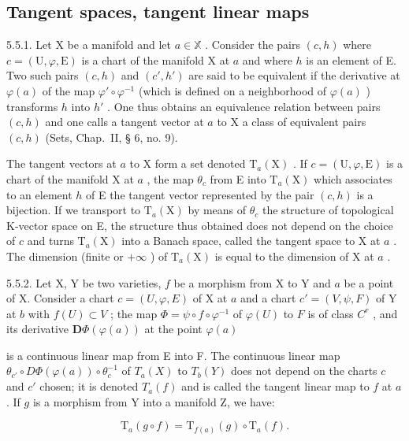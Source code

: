 \subsection{Tangent spaces, tangent linear maps}

5.5.1. Let X be a manifold and let \(a\in\mathbb{X}\) . Consider the pairs \((c,h)\) where \(c=(\mathrm{U},\varphi,\mathrm{E})\) is a chart of the manifold X at \(a\) and where \(h\) is an element of E. Two such pairs \((c,h)\) and \((c',h')\) are said to be equivalent if the derivative at \(\varphi(a)\) of the map \(\varphi'\circ\varphi^{-1}\) (which is defined on a neighborhood of \(\varphi(a)\) ) transforms \(h\) into \(h'\) . One thus obtains an equivalence relation between pairs \((c,h)\) and one calls a tangent vector at \(a\) to X a class of equivalent pairs \((c,h)\) (Sets, Chap.~II, § 6, no. 9).

The tangent vectors at \(a\) to X form a set denoted \(\mathrm{T}_{a}(\mathrm{X})\) . If \(c = (\mathrm{U}, \varphi, \mathrm{E})\) is a chart of the manifold X at \(a\) , the map \(\theta_{c}\) from E into \(\mathrm{T}_{a}(\mathrm{X})\) which associates to an element \(h\) of E the tangent vector represented by the pair \((c, h)\) is a bijection. If we transport to \(\mathrm{T}_{a}(\mathrm{X})\) by means of \(\theta_{c}\) the structure of topological K-vector space on E, the structure thus obtained does not depend on the choice of \(c\) and turns \(\mathrm{T}_{a}(\mathrm{X})\) into a Banach space, called the tangent space to X at \(a\) . The dimension (finite or \(+\infty\) ) of \(\mathrm{T}_{a}(\mathrm{X})\) is equal to the dimension of X at \(a\) .

5.5.2. Let X, Y be two varieties, \(f\) be a morphism from X to Y and \(a\) be a point of X. Consider a chart \(c = (U, \varphi, E)\) of X at \(a\) and a chart \(c' = (V, \psi, F)\) of Y at \(b\) with \(f(U) \subset V\) ; the map \(\Phi = \psi \circ f \circ \varphi^{-1}\) of \(\varphi(U)\) to \(F\) is of class \(C^{r}\) , and its derivative \(\mathbf{D}\Phi(\varphi(a))\) at the point \(\varphi(a)\)

is a continuous linear map from E into F. The continuous linear map \(\theta_{c'} \circ D\Phi(\varphi(a)) \circ \theta_{c}^{-1}\) of \(T_{a}(X)\) to \(T_{b}(Y)\) does not depend on the charts \(c\) and \(c'\) chosen; it is denoted \(T_{a}(f)\) and is called the tangent linear map to \(f\) at \(a\) . If \(g\) is a morphism from Y into a manifold Z, we have:

\[
\mathrm{T} _ {a} (g \circ f) = \mathrm{T} _ {f (a)} (g) \circ \mathrm{T} _ {a} (f).
\]

